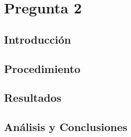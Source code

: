 \documentclass[10pt,a4paper]{article}
\begin{document}
\section{Pregunta 2}



\subsection{Introducción}


\subsection{Procedimiento}


\subsection{Resultados}


\subsection{Análisis y Conclusiones}
 
\end{document}
